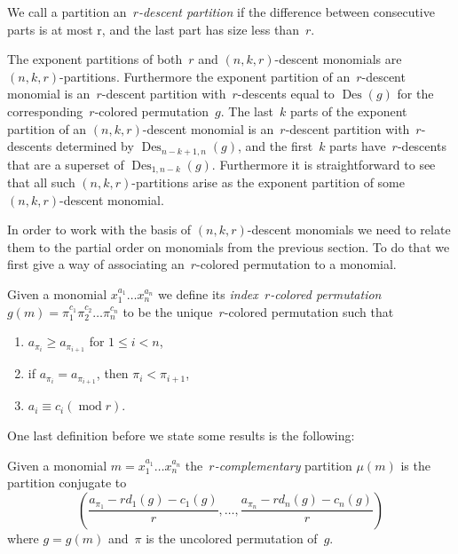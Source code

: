 \documentclass[ALCO,ThmDefs,Unicode,epreuves]{cedram}
\DeclareMathOperator{\modrm}{mod}
\DeclareMathOperator{\Des}{Des}
\begin{document}
\begin{defi}
	We call a partition an~\emph{$r$-descent partition} if the difference between consecutive parts is at most r, and the last 
part has size less than~$r$. 
\end{defi}

	The exponent partitions of both~$r$ and $(n,k,r)$-descent monomials are $(n,k,r)$-partitions. Furthermore the exponent 
partition of an~$r$-descent monomial is an~$r$-descent partition with~$r$-descents equal to $\Des (g)$ for the 
corresponding~$r$-colored permutation~$g$. The last~$k$ parts of the exponent partition of an $(n,k,r)$-descent 
monomial is an~$r$-descent partition with~$r$-descents determined by $\Des _{n-k+1,n}(g)$, and the first~$k$ parts have~$r$-descents that are a superset of $\Des _{1,n-k}(g)$. Furthermore it is straightforward to see that all such 
$(n,k,r)$-partitions arise as the exponent partition of some $(n,k,r)$-descent monomial.

	In order to work with the basis of $(n,k,r)$-descent monomials we need to relate them to the partial order on monomials 
from the previous section. To do that we first give a way of associating an~$r$-colored permutation to a monomial.

	\begin{defi}

		Given a monomial $x_1^{a_1}\ldots x_n^{a_n}$ we define its \emph{index~$r$-colored permutation} 
$g(m)=\pi_1^{c_1}\pi_2^{c_2}\ldots \pi_n^{c_n}$ to be the unique~$r$-colored permutation such that
		\begin{enumerate}
			\item $a_{\pi_i}\geq a_{\pi_{i+1}}$ for $1\leq i<n$,
			\item if $a_{\pi_i}=a_{\pi_{i+1}}$, then $\pi_i<\pi_{i+1}$,
			\item $a_i\equiv c_i (\modrm r)$.
		\end{enumerate}
	\end{defi}

	One last definition before we state some results is the following:

	\begin{defi}

		Given a monomial $m=x_1^{a_1}\ldots x_n^{a_n}$ the~\emph{$r$-complementary} partition $\mu(m)$ is the partition 
conjugate to
\begin{equation}
\left( 
\frac{a_{\pi_1}-rd_1(g)-c_1(g)}{r},\ldots,\frac{a_{\pi_n}-rd_n(g)-c_n(g)}{r}\right)
\end{equation}
where $g=g(m)$ and~$\pi$ is the uncolored permutation of~$g$. 

	\end{defi}
\end{document}
